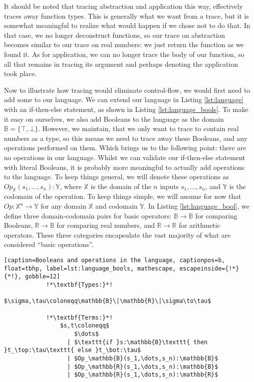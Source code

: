         It should be noted that tracing abstraction and application this way, effectively traces away function types.
        This is generally what we want from a trace, but it is somewhat meaningful to realize what would happen if we chose not to do that.
        In that case, we no longer deconstruct functions, so our trace on abstraction becomes similar to our trace on real numbers: we just return the function as we found it.
        As for application, we can no longer trace the body of our function, so all that remains in tracing its argument and perhaps denoting the application took place.

        Now to illustrate how tracing would eliminate control-flow, we would first need to add some to our language.
        We can extend our language in Listing \ref{lst:language} with an if-then-else statement, as shown in Listing \ref{lst:language_bools}.
        To make it easy on ourselves, we also add Booleans to the language as the domain $\mathbb{B}=\{\top,\bot\}$.
        However, we maintain, that we only want to trace to contain real numbers as a type, so this means we need to trace away these Booleans, and any operations performed on them.
        Which brings us to the following point: there are no operations in our language.
        Whilst we can validate our if-then-else statement with literal Booleans, it is probably more meaningful to actually add operations to the language.
        To keep things general, we will denote these operations as $Op_\mathbb{X}(s_1,\dots,s_n):\mathbb{Y}$, where $\mathbb{X}$ is the domain of the $n$ inputs $s_1,\dots,s_n$, and $\mathbb{Y}$ is the codomain of the operation.
        To keep things simple, we will assume for now that $Op:\mathbb{X}^n\to\mathbb{Y}$ for any domain $\mathbb{X}$ and codomain $\mathbb{Y}$.
        In Listing \ref{lst:language_bool}, we define three domain-codomain pairs for basic operators: $\mathbb{B}\to\mathbb{B}$ for comparing Booleans, $\mathbb{R}\to\mathbb{B}$ for comparing real numbers, and $\mathbb{R}\to\mathbb{R}$ for arithmetic operators.
        These three categories encapsulate the vast majority of what are considered ``basic operations''.

        \begin{lstlisting}[caption=Booleans and operations in the language, captionpos=b, float=tbhp, label=lst:language_bools, mathescape, escapeinside={!*}{*!}, gobble=12]
            !*\textbf{Types:}*!
                $\sigma,\tau\coloneqq\mathbb{B}\|\mathbb{R}\|\sigma\to\tau$

            !*\textbf{Terms:}*!
                $s,t\coloneqq$
                    $\dots$
                  | $\texttt{if }s:\mathbb{B}\texttt{ then }t_\top:\tau\texttt{ else }t_\bot:\tau$
                  | $Op_\mathbb{B}(s_1,\dots,s_n):\mathbb{B}$
                  | $Op_\mathbb{R}(s_1,\dots,s_n):\mathbb{B}$
                  | $Op_\mathbb{R}(s_1,\dots,s_n):\mathbb{R}$
        \end{lstlisting}

